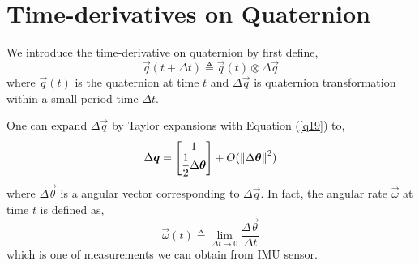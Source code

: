 \section{Time-derivatives on Quaternion}
\label{sec:timed_on_quat}

We introduce the time-derivative on quaternion by first define,
\begin{equation}\label{q29}
	\vec{q}(t+\Delta t) \triangleq \vec{q}(t) \otimes \Delta\vec{q}
\end{equation}
where $\vec{q}(t)$ is the quaternion at time $t$ and $\Delta\vec{q}$ is quaternion transformation within a small period time $\Delta t$. 

One can expand $\Delta\vec{q}$ by Taylor expansions with Equation (\ref{q19}) to,
\begin{equation}\label{q30}
	\Delta\boldsymbol{q} = \begin{bmatrix} 1 \\ \dfrac{1}{2}\Delta{\boldsymbol{\theta}} \end{bmatrix} + O(\left\|\Delta{\boldsymbol{\theta}}\right\|^2)
\end{equation}
where $\Delta{\vec{\theta}}$ is a angular vector corresponding to $\Delta\vec{q}$. In fact, the angular rate $\vec{\omega}$ at time $t$ is defined as,
\begin{equation}\label{q31}
	\vec{\omega} (t) \triangleq \lim_{\Delta{t} \rightarrow 0}\dfrac{\Delta{\vec{\theta}}}{\Delta{t}}
\end{equation}
which is one of measurements we can obtain from IMU sensor.

